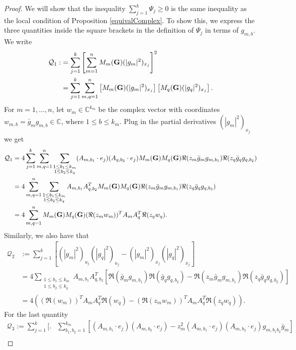 \documentclass[10pt,a4paper]{amsart}
\begin{document}
\begin{proof}
        We will show that the inequality $\sum_{j=1}^k \Psi_j\geq0$ is the same inequality as the local condition of Proposition \ref{equivalComplex}. To show this, we express the three quantities inside the square brackets in the definition of $\Psi_j$ in terms of $g_{m,b}$. We write
		\begin{align*}
			\mathcal{Q}_1:&=\sum_{j=1}^k\left[\sum_{m=1}^n M_{m}({\bf{G}})(|g_m|^2)_{x_j}\right]^2\\
			&=\sum_{j=1}^k\sum_{m, q=1}^{n}\left[M_{m}({\bf{G}})(|g_m|^2)_{x_j} \right] \left[M_{q}({\bf{G}})(|g_q|^2)_{x_j} \right].
		\end{align*}
	For $m = 1, \ldots, n$, let $w_m \in \mathbb{C}^{k_m}$ be the complex vector with coordinates $w_{m,b} = \bar{g}_m g_{m,b} \in \mathbb{C}$, where $1 \leq b \leq k_m$. Plug in the partial derivatives $(|g_m|^2)_{x_j}$ we get
	\begin{align*}
		\mathcal{Q}_1&=4\sum_{j=1}^k\sum_{m, q=1}^{n}\sum_{\substack{1\leq b_1\leq k_m \\ 1\leq b_2\leq k_q}} (A_{m,b_1}\cdot e_j) (A_{q,b_2}\cdot e_j)M_{m}({\bf{G}}) M_{q}({\bf{G}})\Re(z_m \bar{g}_m g_{m,b_1}) \Re(z_q \bar{g}_q g_{q,b_2})\\
		&=4\sum_{m, q=1}^{n}\sum_{\substack{1\leq b_1\leq k_m \\ 1\leq b_2\leq k_q}} A_{m,{b_1}} A_{q,{b_2}}^T M_{m}({\bf{G}}) M_{q}({\bf{G}})\Re(z_m \bar{g}_m g_{m,b_1}) \Re(z_q \bar{g}_q g_{q,b_2})\\
		&=4\sum_{m, q=1}^{n} M_{m}({\bf{G}})M_{q}({\bf{G}})  (\Re(z_mw_{m}))^T A_{m} A_{q}^T  \Re(z_qw_{q}).
	\end{align*}
		Similarly, we also have that
		\begin{align*}
			\mathcal{Q}_2&:=\sum_{j=1}^k\left[(|g_m|^2)_{u_j}(|g_q|^2)_{u_j}-(|g_m|^2)_{x_j}(|g_q|^2)_{x_j}\right]\\
			&=4 \sum_{\substack{1\leq b_1\leq k_m \\ 1\leq b_2\leq k_q}} A_{m,{b_1}} A_{q,{b_2}}^T \left[\Re(\bar{g}_m g_{m,b_1})  \Re(\bar{g}_q g_{q,b_2})  -  \Re(z_m \bar{g}_m g_{m,b_1})  \Re(z_q \bar{g}_q g_{q,b_2})  \right]\\
			&=4\left( (\Re(w_{m}))^TA_{m} A_{q}^T  \Re(w_{q})  -  (\Re(z_mw_{m}))^T A_{m} A_{q}^T  \Re(z_qw_{q}) \right) .
		\end{align*}
		For the last quantity
		\begin{align*}
		\mathcal{Q}_3:= \sum_{j=1}^k\Bigg[\Bigg.&\sum_{b_1, b_2=1}^{k_m}\left[(A_{m,b_1}\cdot e_j) (A_{m,b_2}\cdot e_j)-z_m^2(A_{m,b_1}\cdot e_j) (A_{m,b_2}\cdot e_j)g_{m,b_1b_2}\bar{g}_m\right]\\

\end{align*}
\end{proof}
\end{document}
